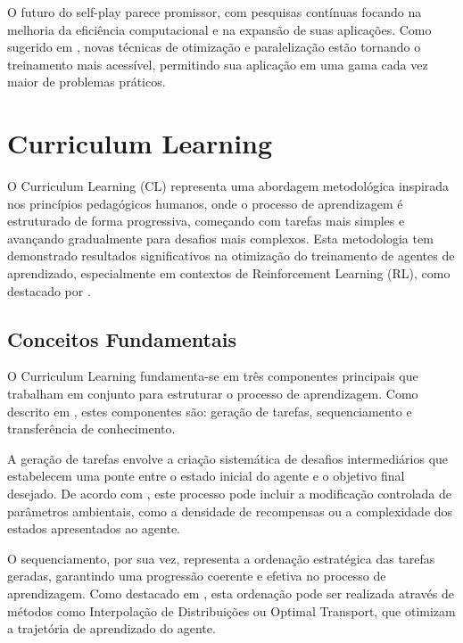 O futuro do self-play parece promissor, com pesquisas contínuas focando na melhoria da eficiência computacional e na expansão de suas aplicações. Como sugerido em \cite{https://huggingface.co/learn/deep-rl-course/unit7/self-play}, novas técnicas de otimização e paralelização estão tornando o treinamento mais acessível, permitindo sua aplicação em uma gama cada vez maior de problemas práticos.

\section{Curriculum Learning}
\label{sec:curriculum}

O Curriculum Learning (CL) representa uma abordagem metodológica inspirada nos princípios pedagógicos humanos, onde o processo de aprendizagem é estruturado de forma progressiva, começando com tarefas mais simples e avançando gradualmente para desafios mais complexos. Esta metodologia tem demonstrado resultados significativos na otimização do treinamento de agentes de aprendizado, especialmente em contextos de Reinforcement Learning (RL), como destacado por \cite{https://arxiv.org/abs/2101.10382}.

\subsection{Conceitos Fundamentais}
\label{subsec:curriculum_conceitos}

O Curriculum Learning fundamenta-se em três componentes principais que trabalham em conjunto para estruturar o processo de aprendizagem. Como descrito em \cite{https://openreview.net/forum?id=anbBFlX1tJ1}, estes componentes são: geração de tarefas, sequenciamento e transferência de conhecimento.

A geração de tarefas envolve a criação sistemática de desafios intermediários que estabelecem uma ponte entre o estado inicial do agente e o objetivo final desejado. De acordo com \cite{https://proceedings.mlr.press/v162/klink22a/klink22a.pdf}, este processo pode incluir a modificação controlada de parâmetros ambientais, como a densidade de recompensas ou a complexidade dos estados apresentados ao agente.

O sequenciamento, por sua vez, representa a ordenação estratégica das tarefas geradas, garantindo uma progressão coerente e efetiva no processo de aprendizagem. Como destacado em \cite{https://jmlr.org/papers/volume21/20-212/20-212.pdf}, esta ordenação pode ser realizada através de métodos como Interpolação de Distribuições ou Optimal Transport, que otimizam a trajetória de aprendizado do agente.

